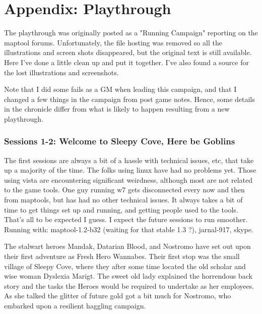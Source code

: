 \clearpage
{}
\section*{Appendix: Playthrough}
\label{sec:playthrough}

\raggedbottom

The playthrough was originally posted as a "Running Campaign" reporting on the maptool forums. Unfortunately, the file hosting was removed so all the illustrations and screen shots disappeared, but the original text is still available. Here I've done a little clean up and put it together. I've also found a source for the lost illustrations and screenshots.

Note that I did some fails as a GM when leading this campaign, and that I changed a few things in the campaign from post game notes. Hence, some details in the chronicle differ from what is likely to happen resulting from a new playthrough.


\subsubsection*{Sessions 1-2: Welcome to Sleepy Cove, Here be Goblins}
\noindent\small
The first sessions are always a bit of a hassle with technical issues, etc, that take up a majority of the time. The folks using linux have had no problems yet. Those using vista are encountering significant weirdness, although most are not related to the game tools. One guy running w7 gets disconnected every now and then from maptools, but has had no other technical issues.
It always takes a bit of time to get things set up and running, and getting people used to the tools. That's all to be expected I guess. I expect the future sessions to run smoother. Running with: maptool-1.2-b32 (waiting for that stable 1.3 ?), jarnal-917, skype.
\normalsize

The stalwart heroes Mandak, Datarian Blood, and Nostromo have set out upon their first adventure as Fresh Hero Wannabes. Their first stop was the small village of Sleepy Cove, where they after some time located the old scholar and wise woman Dyslexia Marigt. The sweet old lady explained the horrendous back story and the tasks the Heroes would be required to undertake as her employees. As she talked the glitter of future gold got a bit much for Nostromo, who embarked upon a resilient haggling campaign.

